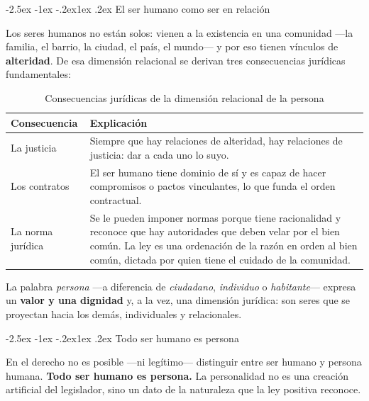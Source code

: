 \documentclass[12pt,oneside]{book}
\makeatletter
\renewcommand\subsection{\@startsection{subsection}{2}{\z@}%
  {-2.5ex \@plus -1ex \@minus -.2ex}{1ex \@plus .2ex}%
  {\normalfont\normalsize\bfseries}}
\makeatother
\begin{document}
\subsection{El ser humano como ser en relación}

Los seres humanos no están solos: vienen a la existencia en una comunidad ---la familia, el barrio, la ciudad, el país, el mundo--- y por eso tienen vínculos de \textbf{alteridad}. De esa dimensión relacional se derivan tres consecuencias jurídicas fundamentales:

\begin{table}[H]
\centering
\begin{tabularx}{\textwidth}{B{0.22\textwidth} Y}
\toprule
\textbf{Consecuencia} & \textbf{Explicación} \\
\midrule
La justicia & Siempre que hay relaciones de alteridad, hay relaciones de justicia: dar a cada uno lo suyo. \\
Los contratos & El ser humano tiene dominio de sí y es capaz de hacer compromisos o pactos vinculantes, lo que funda el orden contractual. \\
La norma jurídica & Se le pueden imponer normas porque tiene racionalidad y reconoce que hay autoridades que deben velar por el bien común. La ley es una ordenación de la razón en orden al bien común, dictada por quien tiene el cuidado de la comunidad. \\
\bottomrule
\end{tabularx}
\caption{Consecuencias jurídicas de la dimensión relacional de la persona}
\end{table}

La palabra \emph{persona} ---a diferencia de \emph{ciudadano}, \emph{individuo} o \emph{habitante}--- expresa un \textbf{valor y una dignidad} y, a la vez, una dimensión jurídica: son seres que se proyectan hacia los demás, individuales y relacionales.

\subsection{Todo ser humano es persona}

\begin{importante}
En el derecho no es posible ---ni legítimo--- distinguir entre ser humano y persona humana. \textbf{Todo ser humano es persona.} La personalidad no es una creación artificial del legislador, sino un dato de la naturaleza que la ley positiva reconoce.
\end{importante}
\end{document}
